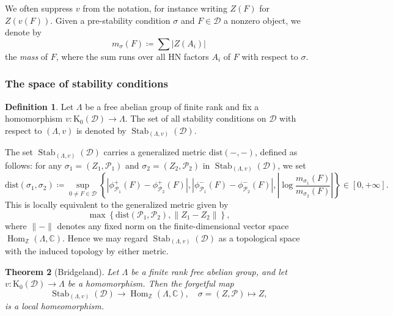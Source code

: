 \documentclass[11pt, reqno]{amsart}
\numberwithin{equation}{section}
\theoremstyle{plain}
\newtheorem{theorem}{Theorem}[section]
\theoremstyle{remark}
\theoremstyle{definition}
\newtheorem{definition}[theorem]{Definition}
\theoremstyle{italicsname}
\DeclareMathOperator{\Stab}{Stab}
\DeclareMathOperator{\Hom}{Hom}
\newcommand{\cD}{\mathscr{D}}
\newcommand{\cP}{\mathscr{P}}
\newcommand{\rK}{\mathrm{K}}
\def\CC{\ensuremath{\mathbb{C}}}
\def\ZZ{\ensuremath{\mathbb{Z}}}
\begin{document}
We often suppress $v$ from the notation, for instance writing $Z(F)$ for $Z(v(F))$.
Given a pre-stability condition $\sigma$ and $F\in\cD$ a nonzero object, we denote by 
\begin{equation}\label{eq:DefMass}
m_{\sigma}(F)\coloneqq\sum |Z(A_i)|    
\end{equation}
the \emph{mass} of $F$, where the sum runs over all HN factors $A_i$ of $F$ with respect to $\sigma$.

\subsubsection{The space of stability conditions} 

\begin{definition}
Let $\Lambda$ be a free abelian group of finite rank and fix a homomorphism $v\colon\rK_0(\cD) \to\Lambda$. 
The set of all stability conditions on $\cD$ with respect to $(\Lambda,v)$ is denoted by $\Stab_{(\Lambda, v)}(\cD)$.
\end{definition}

The set $\Stab_{(\Lambda, v)}(\cD)$ carries a generalized metric $\mathrm{dist}(-,-)$, defined as follows: for any $\sigma_1=(Z_1,\cP_1)$ and $\sigma_2=(Z_2,\cP_2)$ in $\Stab_{(\Lambda, v)}(\cD)$, we set
\[
\mathrm{dist}(\sigma_1,\sigma_2)\coloneqq\sup_{0\neq F\in \cD}\left\{\left|\phi^+_{\cP_1}(F)-\phi^+_{\cP_2}(F)\right|,\left|\phi^-_{\cP_1}(F)-\phi^-_{\cP_2}(F)\right|,\left|\log \frac{m_{\sigma_1}(F)}{m_{\sigma_2}(F)}\right|\right\}\in [0,+\infty].
\]
This is locally equivalent to the generalized metric given by
\[
\max\left\{\mathrm{dist}(\cP_1,\cP_2), \|Z_1-Z_2\|\right\},
\]
where $\|-\|$ denotes any fixed norm on the finite-dimensional vector space $\Hom_{\ZZ}(\Lambda, \CC)$. 
Hence we may regard $\Stab_{(\Lambda, v)}(\cD)$ as a topological space with the induced topology by either metric. 

\begin{theorem}[Bridgeland]\label{thm:bridgeland-deformation} 
Let $\Lambda$ be a finite rank free abelian group, and let 
$v \colon \rK_0(\cD) \to \Lambda$ be a homomorphism. 
Then the forgetful map
$$ \Stab_{(\Lambda, v)}(\cD)\longrightarrow \Hom_{\ZZ}(\Lambda, \CC),\quad \sigma=(Z,\cP)\longmapsto Z,$$
is a local homeomorphism.
\end{theorem}
\end{document}
